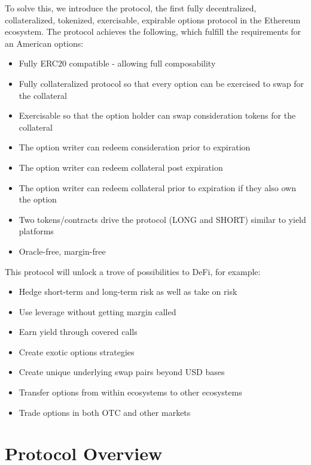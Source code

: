 To solve this, we introduce the \greekfi protocol, the first fully decentralized, collateralized, tokenized, exercisable, expirable options protocol in the Ethereum ecosystem.
The protocol achieves the following, which fulfill the requirements for an American options:
\begin{itemize}
  \setlength{\itemsep}{0pt}
  \setlength{\parskip}{0pt}
  \item Fully ERC20 compatible - allowing full composability
  \item Fully collateralized protocol so that every option can be exercised to swap for the collateral
  \item Exercisable so that the option holder can swap consideration tokens for the collateral
  \item The option writer can redeem consideration prior to expiration
  \item The option writer can redeem collateral post expiration
  \item The option writer can redeem collateral prior to expiration if they also own the option
  \item Two tokens/contracts drive the protocol (LONG and SHORT) similar to yield platforms
  \item Oracle-free, margin-free
\end{itemize}

This protocol will unlock a trove of possibilities to DeFi, for example:

\begin{itemize}
  \setlength{\itemsep}{0pt}
  \setlength{\parskip}{0pt}
  \item Hedge short-term and long-term risk as well as take on risk
  \item Use leverage without getting margin called
  \item Earn yield through covered calls
  \item Create exotic options strategies
  \item Create unique underlying swap pairs beyond USD bases
  \item Transfer options from within ecosystems to other ecosystems
  \item Trade options in both OTC and other markets
\end{itemize}

\section{\label{sec:protocol}Protocol Overview}

